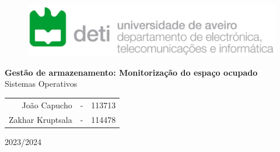 \thispagestyle{empty}

\begin{figure}[H]
	\centering
	\includegraphics[width=12cm]{figs/deti.png}
\end{figure}

\vspace{4cm}

\begin{center}
	\onehalfspacing\textbf{\huge
		Gestão de armazenamento:
		Monitorização do espaço ocupado
	}\\
	\vspace{1cm}
	{\LARGE Sistemas Operativos}

	\vspace{2cm}

	\large
	\begin{tabular}{ r c c }
		João Capucho     & - & 113713 \\
		Zakhar Kruptsala & - & 114478
	\end{tabular}
	\vfill
	{\Large 2023/2024}
\end{center}
